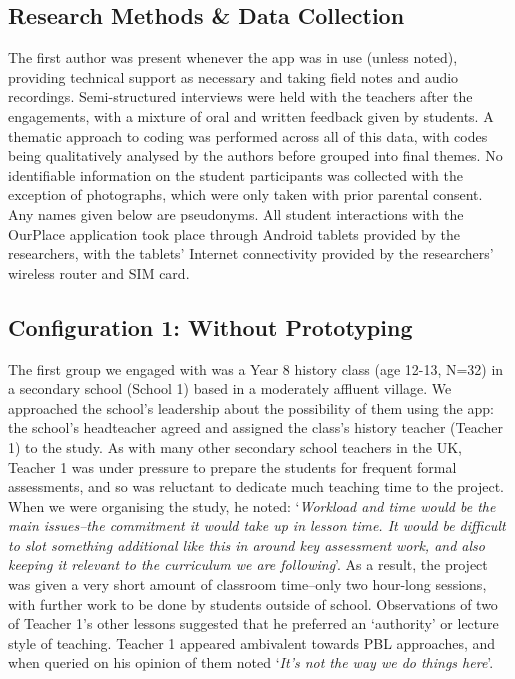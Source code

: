 \documentclass[,hyphens]{sigchi}
\begin{document}
\subsection{Research Methods \& Data Collection}

The first author was present whenever the app was in use (unless noted), providing technical support as necessary and taking field notes and audio recordings. Semi-structured interviews were held with the teachers after the engagements, with a mixture of oral and written feedback given by students. A thematic approach to coding was performed across all of this data, with codes being qualitatively analysed by the authors before grouped into final themes. No identifiable information on the student participants was collected with the exception of photographs, which were only taken with prior parental consent. Any names given below are pseudonyms. All student interactions with the OurPlace application took place through Android tablets provided by the researchers, with the tablets' Internet connectivity provided by the researchers' wireless router and SIM card.

\subsection{Configuration 1: Without Prototyping}
The first group we engaged with was a Year 8 history class (age 12-13, N=32) in a secondary school (School 1) based in a moderately affluent village. We approached the school's leadership about the possibility of them using the app: the school's headteacher agreed and assigned the class's history teacher (Teacher 1) to the study. As with many other secondary school teachers in the UK, Teacher 1 was under pressure to prepare the students for frequent formal assessments, and so was reluctant to dedicate much teaching time to the project. When we were organising the study, he noted: `\textit{Workload and time would be the main issues--the commitment it would take up in lesson time. It would be difficult to slot something additional like this in around key assessment work, and also keeping it relevant to the curriculum we are following}'. As a result, the project was given a very short amount of classroom time--only two hour-long sessions, with further work to be done by students outside of school. Observations of two of Teacher 1's other lessons suggested that he preferred an `authority' or lecture style of teaching. Teacher 1 appeared ambivalent towards PBL approaches, and when queried on his opinion of them noted `\textit{It's not the way we do things here}'.
\end{document}
